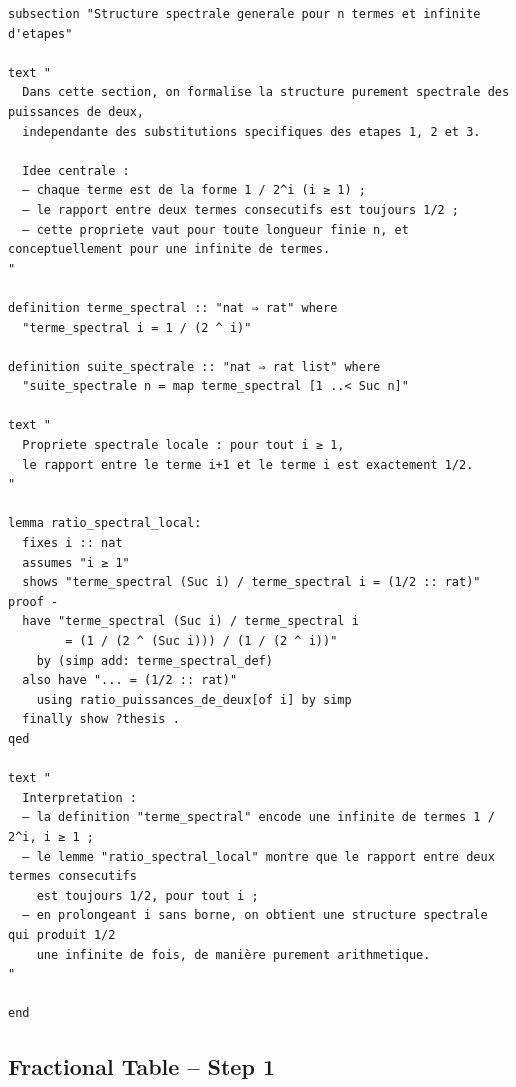 \documentclass[a4paper,11pt]{article}
\begin{document}
\begin{holcode}[title={\textcolor{white}{File: methode\_de\_philippot.thy -- COMPLETE}}]
\begin{lstlisting}
subsection "Structure spectrale generale pour n termes et infinite d'etapes"

text "
  Dans cette section, on formalise la structure purement spectrale des puissances de deux,
  independante des substitutions specifiques des etapes 1, 2 et 3.

  Idee centrale :
  – chaque terme est de la forme 1 / 2^i (i ≥ 1) ;
  – le rapport entre deux termes consecutifs est toujours 1/2 ;
  – cette propriete vaut pour toute longueur finie n, et conceptuellement pour une infinite de termes.
"

definition terme_spectral :: "nat ⇒ rat" where
  "terme_spectral i = 1 / (2 ^ i)"

definition suite_spectrale :: "nat ⇒ rat list" where
  "suite_spectrale n = map terme_spectral [1 ..< Suc n]"

text "
  Propriete spectrale locale : pour tout i ≥ 1,
  le rapport entre le terme i+1 et le terme i est exactement 1/2.
"

lemma ratio_spectral_local:
  fixes i :: nat
  assumes "i ≥ 1"
  shows "terme_spectral (Suc i) / terme_spectral i = (1/2 :: rat)"
proof -
  have "terme_spectral (Suc i) / terme_spectral i
        = (1 / (2 ^ (Suc i))) / (1 / (2 ^ i))"
    by (simp add: terme_spectral_def)
  also have "... = (1/2 :: rat)"
    using ratio_puissances_de_deux[of i] by simp
  finally show ?thesis .
qed

text "
  Interpretation :
  – la definition "terme_spectral" encode une infinite de termes 1 / 2^i, i ≥ 1 ;
  – le lemme "ratio_spectral_local" montre que le rapport entre deux termes consecutifs
    est toujours 1/2, pour tout i ;
  – en prolongeant i sans borne, on obtient une structure spectrale qui produit 1/2
    une infinite de fois, de manière purement arithmetique.
"

end

\end{lstlisting}
\end{holcode}

\subsection{Fractional Table -- Step 1}
\end{document}

